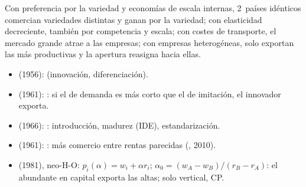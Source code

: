 \documentclass{article}
\begin{document}
\begin{columnas}
\begin{ideaclave}
Con preferencia por la variedad y economías de escala internas, 2~países idénticos comercian variedades distintas y ganan por la variedad; con elasticidad decreciente, también por competencia y escala; con costes de transporte, el mercado grande atrae a las empresas; con empresas heterogéneas, solo exportan las más productivas y la apertura reasigna hacia ellas.
\end{ideaclave}

\begin{itemize}
\item {} (1956):  (innovación, diferenciación).
\item {} (1961): : si el de demanda es más corto que el de imitación, el innovador exporta.
\item {} (1966): : introducción, madurez (IDE), estandarización.
\item {} (1961): : más comercio entre rentas parecidas (, 2010).
\item {} (1981), neo-H-O: $p_i(\alpha)=w_i+\alpha r_i$;  $\alpha_0=(w_A-w_B)/(r_B-r_A)$: el abundante en capital exporta las altas; solo vertical, CP.
\end{itemize}


\end{columnas}
\end{document}
